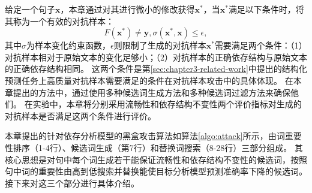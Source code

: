 给定一个句子$\bm{x}$，本章通过对其进行微小的修改获得$\bm{x}^*$，当$\bm{x}^*$满足以下条件时，将其称为一个有效的对抗样本：
$$F(\bm{x}^*) \neq \bm{y}, \sigma(\bm{x}^*, \bm{x})\le \epsilon, $$
其中$\sigma$为样本变化约束函数，$\epsilon$则限制了生成的对抗样本$\bm{x}^*$需要满足两个条件：（1）对抗样本相对于原始文本的变化足够小；（2）对抗样本的正确依存结构与原始文本的正确依存结构相同。
这两个条件是第\ref{sec:chapter3-related-work}中提出的结构化预测任务上高质量对抗样本需要满足的条件在对抗样本攻击中的具体体现。
在本章提出的方法中，通过使用多种候选词生成方法和多种候选词过滤方法来确保他们。
在实验中，本章将分别采用流畅性和依存结构不变性两个评价指标对生成的对抗样本是否满足这两个条件进行评价。

本章提出的针对依存分析模型的黑盒攻击算法如算法\ref{algo:attack}所示，由词重要性排序（1-4行）、候选词生成（第7行）和替换词搜索（8-28行）三部分组成。
其核心思想是对句中每个词生成若干能保证流畅性和依存结构不变性的候选词，按照句中词的重要性由高到低搜索并替换能使目标分析模型预测准确率下降的候选词。
接下来对这三个部分进行具体介绍。

